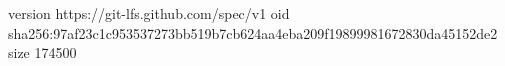 version https://git-lfs.github.com/spec/v1
oid sha256:97af23c1c953537273bb519b7cb624aa4eba209f19899981672830da45152de2
size 174500
